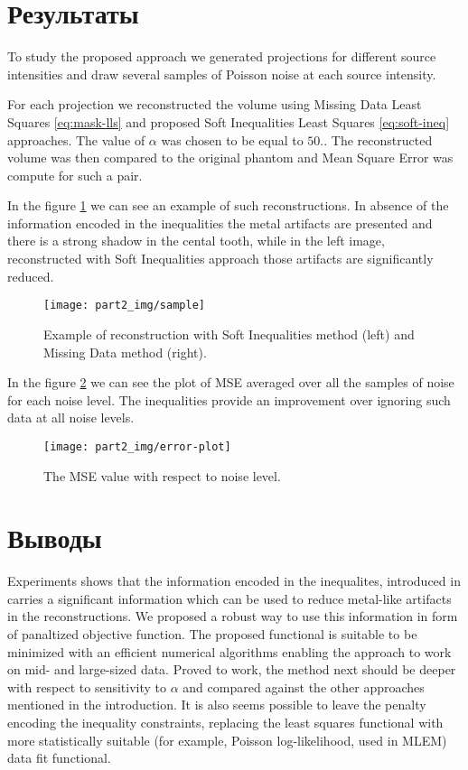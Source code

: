 \section{Результаты}
\label{s-results}
To study the proposed approach we generated projections for different source intensities and draw several samples of Poisson noise at each source intensity.

For each projection we reconstructed the volume using Missing Data Least Squares \eqref{eq:mask-lls} and proposed Soft Inequalities Least Squares \eqref{eq:soft-ineq} approaches. The value of $\alpha$ was chosen to be equal to $50$.. The reconstructed volume was then compared to the original phantom and Mean Square Error was compute for such a pair.

In the figure \ref{sample} we can see an example of such reconstructions. In absence of the information encoded in the inequalities the metal artifacts are presented and there is a strong shadow in the cental tooth, while in the left image, reconstructed with Soft Inequalities approach those artifacts are significantly reduced.
\begin{figure}
  \centering
  \texttt{[image: part2\_img/sample]}
  \caption{Example of reconstruction with Soft Inequalities method (left)
    and Missing Data method (right).}
  \label{sample}
\end{figure}
In the figure \ref{error-plot} we can see the plot of MSE averaged over all the samples of noise for each noise level. The inequalities provide an improvement over ignoring such data at all noise levels.
\begin{figure}
  \centering
  \texttt{[image: part2\_img/error-plot]}
  \caption{The MSE value with respect to noise level.}
  \label{error-plot}
\end{figure}

\section{Выводы}
\label{s-conclusion}

Experiments shows that the information encoded in the inequalites, introduced in \cite{chukalinaway} carries a significant information which can be used to reduce metal-like artifacts in the reconstructions. We proposed a robust way to use this information in form of panaltized objective function. The proposed functional is suitable to be minimized with an efficient numerical algorithms enabling the approach to work on mid- and large-sized data. Proved to work, the method next should be deeper with respect to sensitivity to $\alpha$ and compared against the other approaches mentioned in the introduction. It is also seems possible to leave the penalty encoding the inequality constraints, replacing the least squares functional with more statistically suitable (for example, Poisson log-likelihood, used in MLEM) data fit functional.

